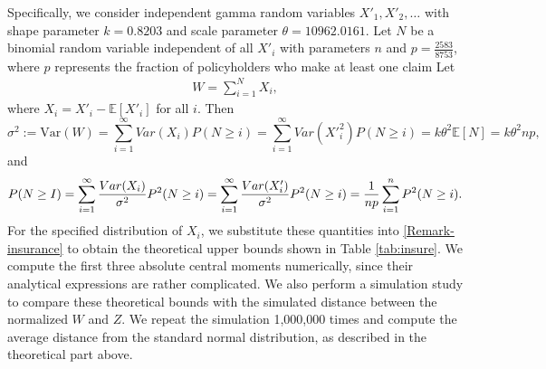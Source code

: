 \documentclass[pdflatex,sn-mathphys-ay]{sn-jnl}
\newcommand{\beas}{\begin{eqnarray*}}
\newcommand{\enas}{\end{eqnarray*}}
\newcommand{\E}{\mathbb{E}}
\newcommand{\Var}{\mathrm{Var}}
\theoremstyle{thmstyleone}%
\theoremstyle{thmstyletwo}%
\theoremstyle{thmstylethree}%
\begin{document}
Specifically, we consider independent gamma random variables $X'_1,X'_2,\ldots$ with shape parameter $k=0.8203$ %
and scale parameter $\theta=10962.0161$. Let $N$ be a binomial random variable independent of all $X'_i$ with parameters $n$ and $p=\frac{2583}{8753}$, where $p$ represents the fraction of policyholders who make at least one claim Let
\beas
W=\sum_{i=1}^NX_i,
\enas 
where $X_i=X'_i-\E[X'_i]$ for all $i$. Then $$\sigma^2 := \Var(W) = \sum_{i=1}^\infty Var(X_i) P(N\ge i)=\sum_{i=1}^\infty Var( X'^2_i )P(N\ge i)=k\theta^2\E[N]=k\theta^2 np,$$
and  \[
P(N\ge I) = \sum_{i=1}^\infty \frac{Var(X_i)}{\sigma^2}P^2(N \ge i) = \sum_{i=1}^\infty \frac{Var(X'_i)}{\sigma^2}P^2(N \ge i)={1\over np}\sum_{i=1}^nP^2(N\ge i).
\]
For the specified distribution of $X_i$, we substitute these quantities into \eqref{Remark-insurance} to obtain the theoretical upper bounds shown in Table \ref{tab:insure}. We compute the first three absolute central moments numerically, since their analytical expressions are rather complicated. We also perform a simulation study to compare these theoretical bounds with the simulated distance between the normalized $W$ and $Z$. We repeat the simulation 1,000,000 times and compute the average distance from the standard normal distribution, as described in the theoretical part above.
\end{document}
